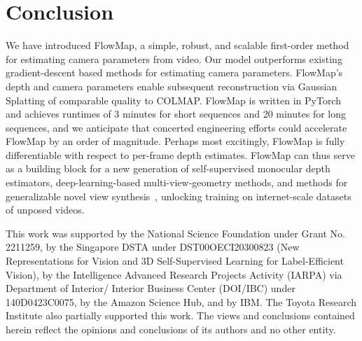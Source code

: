 \vspace{-5pt}

\section{Conclusion}
\label{sec:conclusion}
We have introduced FlowMap, a simple, robust, and scalable first-order method for estimating camera parameters from video.
Our model outperforms existing gradient-descent based methods for estimating camera parameters. 
FlowMap's depth and camera parameters enable subsequent reconstruction via Gaussian Splatting of comparable quality to COLMAP.
FlowMap is written in PyTorch and achieves runtimes of 3 minutes for short sequences and 20 minutes for long sequences, and we anticipate that concerted engineering efforts could accelerate FlowMap by an order of magnitude.
Perhaps most excitingly, FlowMap is fully differentiable with respect to per-frame depth estimates.
FlowMap can thus serve as a building block for a new generation of self-supervised monocular depth estimators, deep-learning-based multi-view-geometry methods, and methods for generalizable novel view synthesis~\cite{pixelnerf,tewari2023diffusion,charatan23pixelsplat,wang2021ibrnet,du2023cross,suhail2022generalizable}, unlocking training on internet-scale datasets of unposed videos.



\small{} This work was supported by the National Science Foundation under Grant No. 2211259, by the Singapore DSTA under DST00OECI20300823 (New Representations for Vision and 3D Self-Supervised Learning for Label-Efficient Vision), by the Intelligence Advanced Research Projects Activity (IARPA) via Department of Interior/ Interior Business Center (DOI/IBC) under 140D0423C0075, by the Amazon Science Hub, and by IBM. The Toyota Research Institute also partially supported this work. The views and conclusions contained herein reflect the opinions and conclusions of its authors and no other entity.
